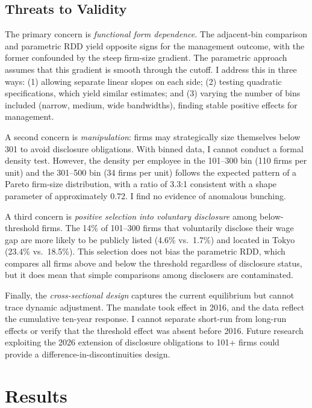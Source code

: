 \documentclass[12pt]{article}
\begin{document}
\subsection{Threats to Validity}

The primary concern is \textit{functional form dependence}. The adjacent-bin comparison and parametric RDD yield opposite signs for the management outcome, with the former confounded by the steep firm-size gradient. The parametric approach assumes that this gradient is smooth through the cutoff. I address this in three ways: (1) allowing separate linear slopes on each side; (2) testing quadratic specifications, which yield similar estimates; and (3) varying the number of bins included (narrow, medium, wide bandwidths), finding stable positive effects for management.

A second concern is \textit{manipulation}: firms may strategically size themselves below 301 to avoid disclosure obligations. With binned data, I cannot conduct a formal \citet{mccrary2008} density test. However, the density per employee in the 101--300 bin (110 firms per unit) and the 301--500 bin (34 firms per unit) follows the expected pattern of a Pareto firm-size distribution, with a ratio of 3.3:1 consistent with a shape parameter of approximately 0.72. I find no evidence of anomalous bunching.

A third concern is \textit{positive selection into voluntary disclosure} among below-threshold firms. The 14\% of 101--300 firms that voluntarily disclose their wage gap are more likely to be publicly listed (4.6\% vs.\ 1.7\%) and located in Tokyo (23.4\% vs.\ 18.5\%). This selection does not bias the parametric RDD, which compares all firms above and below the threshold regardless of disclosure status, but it does mean that simple comparisons among disclosers are contaminated.

Finally, the \textit{cross-sectional design} captures the current equilibrium but cannot trace dynamic adjustment. The mandate took effect in 2016, and the data reflect the cumulative ten-year response. I cannot separate short-run from long-run effects or verify that the threshold effect was absent before 2016. Future research exploiting the 2026 extension of disclosure obligations to 101+ firms could provide a difference-in-discontinuities design.


\section{Results}
\label{sec:results}
\end{document}
